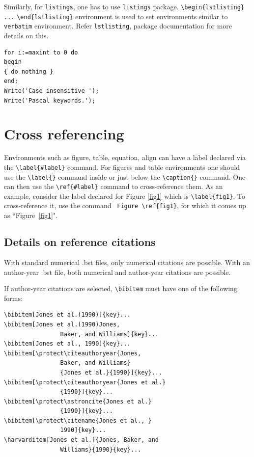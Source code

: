 \documentclass[unnumsec,webpdf,contemporary,large]{oup-authoring-template}%
\theoremstyle{thmstyleone}%
\theoremstyle{thmstyletwo}%
\theoremstyle{thmstylethree}%
\begin{document}
Similarly, for \verb+listings+, one has to use \verb+listings+ package. \verb+\begin{lstlisting}+ \verb+...+ \verb+\end{lstlisting}+ environment is used to set environments similar to \verb+verbatim+ environment. Refer \verb+lstlisting+, package documentation for more details on this.


\begin{minipage}{\hsize}%
\lstset{language=Pascal}%
\begin{lstlisting}[frame=single,framexleftmargin=-1pt,framexrightmargin=-17pt,framesep=12pt,linewidth=0.98\textwidth]% Start your code-block
for i:=maxint to 0 do
begin
{ do nothing }
end;
Write('Case insensitive ');
Write('Pascal keywords.');
\end{lstlisting}
\end{minipage}


\section{Cross referencing}\label{sec8}

Environments such as figure, table, equation, align can have a label
declared via the \verb+\label{#label}+ command. For figures and table
environments one should use the \verb+\label{}+ command inside or just
below the \verb+\caption{}+ command.  One can then use the
\verb+\ref{#label}+ command to cross-reference them. As an example, consider
the label declared for Figure \ref{fig1} which is
\verb+\label{fig1}+. To cross-reference it, use the command
\verb+ Figure \ref{fig1}+, for which it comes up as
``Figure~\ref{fig1}".

\subsection{Details on reference citations}\label{subsec3}

With standard numerical .bst files, only numerical citations are possible.
With an author-year .bst file, both numerical and author-year citations are possible.

If author-year citations are selected, \verb+\bibitem+ must have one of the following forms:


{\footnotesize%
\begin{verbatim}
\bibitem[Jones et al.(1990)]{key}...
\bibitem[Jones et al.(1990)Jones,
                Baker, and Williams]{key}...
\bibitem[Jones et al., 1990]{key}...
\bibitem[\protect\citeauthoryear{Jones,
                Baker, and Williams}
                {Jones et al.}{1990}]{key}...
\bibitem[\protect\citeauthoryear{Jones et al.}
                {1990}]{key}...
\bibitem[\protect\astroncite{Jones et al.}
                {1990}]{key}...
\bibitem[\protect\citename{Jones et al., }
                1990]{key}...
\harvarditem[Jones et al.]{Jones, Baker, and
                Williams}{1990}{key}...
\end{verbatim}}
\end{document}
